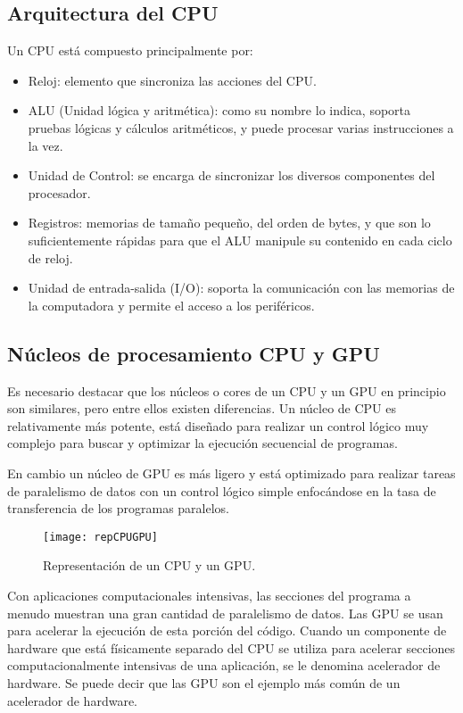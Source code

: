      \subsection{Arquitectura del CPU}

Un CPU está compuesto principalmente por:
\begin{itemize}
\item Reloj: elemento que sincroniza las acciones del CPU.
\item ALU (Unidad lógica y aritmética): como su nombre lo indica, soporta pruebas lógicas y cálculos aritméticos, y puede procesar varias instrucciones a la vez.
\item Unidad de Control: se encarga de sincronizar los diversos componentes del procesador.
\item Registros: memorias de tamaño pequeño, del orden de bytes, y que son lo suficientemente rápidas para que el ALU manipule su contenido en cada ciclo de reloj.
\item Unidad de entrada-salida (I/O): soporta la comunicación con las memorias de la computadora y permite el acceso a los periféricos.
\end{itemize}   

\subsection{Núcleos de procesamiento CPU y GPU}
    Es necesario destacar que los núcleos o cores de un CPU y un GPU en principio son similares, pero entre ellos existen diferencias. Un núcleo de CPU es relativamente más potente, está diseñado para realizar un control lógico muy complejo para buscar y optimizar la ejecución secuencial de programas.
\newline
    
    En cambio un núcleo de GPU es más ligero y está optimizado para realizar tareas de paralelismo de datos con un control lógico simple enfocándose en la tasa de transferencia de los programas paralelos.
 \newline
 
        \begin{figure}[ht]
      \centering
        \texttt{[image: repCPUGPU]}
        \caption{Representación de un CPU y un GPU\cite{NCUDA}.}
        \label{fig:repgpgpu}
    \end{figure}

    Con aplicaciones computacionales intensivas, las secciones del programa a menudo muestran una gran cantidad de paralelismo de datos. Las GPU se usan para acelerar la ejecución de esta porción del código. Cuando un componente de hardware que está físicamente separado del CPU se utiliza para acelerar secciones computacionalmente intensivas de una aplicación, se le denomina acelerador de hardware. Se puede decir que las GPU son el ejemplo más común de un acelerador de hardware.

